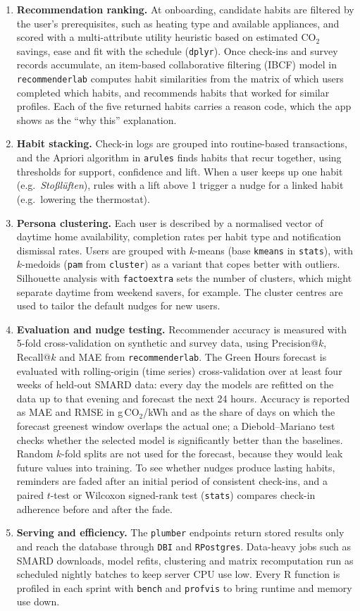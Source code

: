 \documentclass[conference]{IEEEtran}
\newcommand{\COtwo}{CO$_2$}
\newcommand{\pkg}[1]{\texttt{#1}}
\begin{document}
\begin{enumerate}
\item \textbf{Recommendation ranking.} At onboarding, candidate habits are filtered by the user's prerequisites, such as heating type and available appliances, and scored with a multi-attribute utility heuristic based on estimated \COtwo{} savings, ease and fit with the schedule (\pkg{dplyr}). Once check-ins and survey records accumulate, an item-based collaborative filtering (IBCF) model in \pkg{recommenderlab} computes habit similarities from the matrix of which users completed which habits, and recommends habits that worked for similar profiles. Each of the five returned habits carries a reason code, which the app shows as the ``why this'' explanation.
\item \textbf{Habit stacking.} Check-in logs are grouped into routine-based transactions, and the Apriori algorithm in \pkg{arules} finds habits that recur together, using thresholds for support, confidence and lift. When a user keeps up one habit (e.g.\ \emph{Sto\ss l\"uften}), rules with a lift above 1 trigger a nudge for a linked habit (e.g.\ lowering the thermostat).
\item \textbf{Persona clustering.} Each user is described by a normalised vector of daytime home availability, completion rates per habit type and notification dismissal rates. Users are grouped with $k$-means (base \texttt{kmeans} in \pkg{stats}), with $k$-medoids (\pkg{pam} from \pkg{cluster}) as a variant that copes better with outliers. Silhouette analysis with \pkg{factoextra} sets the number of clusters, which might separate daytime from weekend savers, for example. The cluster centres are used to tailor the default nudges for new users.
\item \textbf{Evaluation and nudge testing.} Recommender accuracy is measured with 5-fold cross-validation on synthetic and survey data, using Precision@$k$, Recall@$k$ and MAE from \pkg{recommenderlab}. The Green Hours forecast is evaluated with rolling-origin (time series) cross-validation over at least four weeks of held-out SMARD data: every day the models are refitted on the data up to that evening and forecast the next 24 hours. Accuracy is reported as MAE and RMSE in g\,\COtwo/kWh and as the share of days on which the forecast greenest window overlaps the actual one; a Diebold--Mariano test checks whether the selected model is significantly better than the baselines. Random $k$-fold splits are not used for the forecast, because they would leak future values into training. To see whether nudges produce lasting habits, reminders are faded after an initial period of consistent check-ins, and a paired $t$-test or Wilcoxon signed-rank test (\pkg{stats}) compares check-in adherence before and after the fade.
\item \textbf{Serving and efficiency.} The \pkg{plumber} endpoints return stored results only and reach the database through \pkg{DBI} and \pkg{RPostgres}. Data-heavy jobs such as SMARD downloads, model refits, clustering and matrix recomputation run as scheduled nightly batches to keep server CPU use low. Every R function is profiled in each sprint with \pkg{bench} and \pkg{profvis} to bring runtime and memory use down.
\end{enumerate}
\end{document}
